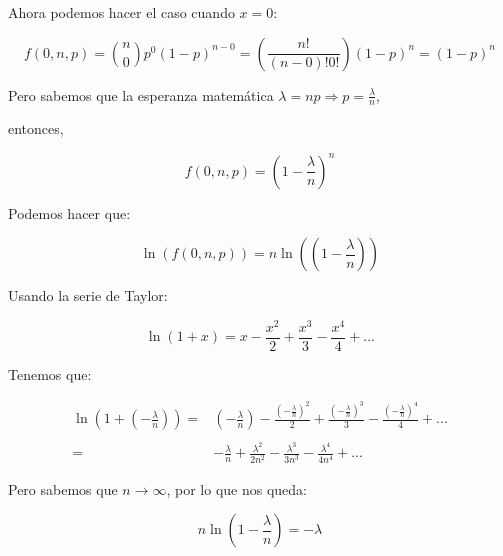 \documentclass{beamer}
\begin{document}
\begin{frame}{}

  Ahora podemos hacer el caso cuando $x=0$:

  \begin{equation}
    f(0,n,p) = \binom{n}{0} p^0 (1-p)^{n-0} = (\frac{n!}{(n-0)! 0!})(1-p)^n = (1-p)^n
  \end{equation}

Pero sabemos que la esperanza matemática $\lambda = np \Rightarrow p =
\frac{\lambda}{n}$,
  
entonces,

\begin{equation}
  f(0,n,p) = (1-\frac{\lambda}{n})^n
\end{equation}

Podemos hacer que:

\begin{equation}
  \ln(f(0,n,p)) = n \ln((1-\frac{\lambda}{n}))
\end{equation}

\end{frame}

\begin{frame}{}
  Usando la serie de Taylor:

  \begin{equation}
    \ln(1+x) = x - \frac{x^2}{2} + \frac{x^3}{3} - \frac{x^4}{4} + ...
  \end{equation}

  Tenemos que:

  \begin{equation}
    \begin{array}{rl}
    \ln(1+(-\frac{\lambda}{n})) = & (-\frac{\lambda}{n}) - \frac{(-\frac{\lambda}{n})^2}{2} + \frac{(-\frac{\lambda}{n})^3}{3} - \frac{(-\frac{\lambda}{n})^4}{4} + ... \\
    \\
                                = & -\frac{\lambda}{n} + \frac{\lambda^2}{2n^2} - \frac{\lambda^3}{3n^3} - \frac{\lambda^4}{4n^4}+...
    \end{array}
  \end{equation}

  Pero sabemos que $n \to \infty$, por lo que nos queda:

  \begin{equation}
    n \ln(1-\frac{\lambda}{n}) = -\lambda
  \end{equation}  

\end{frame}
\end{document}

